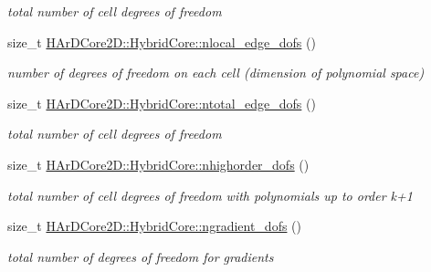 \begin{DoxyCompactItemize}
\begin{DoxyCompactList}\small\item\em total number of cell degrees of freedom \end{DoxyCompactList}\item 
\mbox{\label{group__HybridCore_ga6a45e5ff09d21b18874e1446cd9de9bc}} 
size\+\_\+t \hyperlink{group__HybridCore_ga6a45e5ff09d21b18874e1446cd9de9bc}{H\+Ar\+D\+Core2\+D\+::\+Hybrid\+Core\+::nlocal\+\_\+edge\+\_\+dofs} ()
\begin{DoxyCompactList}\small\item\em number of degrees of freedom on each cell (dimension of polynomial space) \end{DoxyCompactList}\item 
\mbox{\label{group__HybridCore_ga49a703b6786215e5acf8bb59ecdbc9ea}} 
size\+\_\+t \hyperlink{group__HybridCore_ga49a703b6786215e5acf8bb59ecdbc9ea}{H\+Ar\+D\+Core2\+D\+::\+Hybrid\+Core\+::ntotal\+\_\+edge\+\_\+dofs} ()
\begin{DoxyCompactList}\small\item\em total number of cell degrees of freedom \end{DoxyCompactList}\item 
\mbox{\label{group__HybridCore_gaa7f78bc066429a18ad596d45a79d37bc}} 
size\+\_\+t \hyperlink{group__HybridCore_gaa7f78bc066429a18ad596d45a79d37bc}{H\+Ar\+D\+Core2\+D\+::\+Hybrid\+Core\+::nhighorder\+\_\+dofs} ()
\begin{DoxyCompactList}\small\item\em total number of cell degrees of freedom with polynomials up to order k+1 \end{DoxyCompactList}\item 
\mbox{\label{group__HybridCore_ga6f7c5ef5103bed8a3e0ecc18d592b1f9}} 
size\+\_\+t \hyperlink{group__HybridCore_ga6f7c5ef5103bed8a3e0ecc18d592b1f9}{H\+Ar\+D\+Core2\+D\+::\+Hybrid\+Core\+::ngradient\+\_\+dofs} ()
\begin{DoxyCompactList}\small\item\em total number of degrees of freedom for gradients \end{DoxyCompactList}\item 
\mbox{\label{group__HybridCore_gae6e771ab58f248db8f051d47de982cf5}} 

\end{DoxyCompactItemize}
